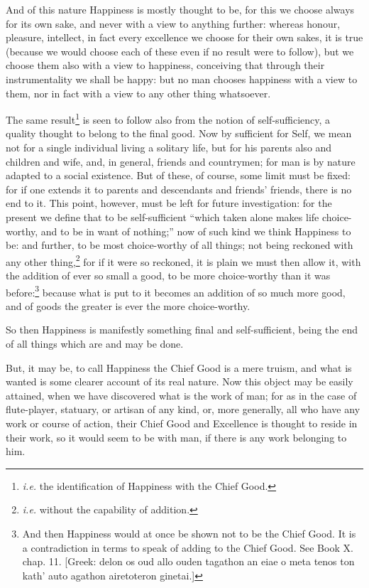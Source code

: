 And of this nature Happiness is mostly thought to be, for this we choose always
for its own sake, and never with a view to anything further: whereas honour,
pleasure, intellect, in fact every excellence we choose for their own sakes, it
is true (because we would choose each of these even if no result were to
follow), but we choose them also with a view to happiness, conceiving that
through their instrumentality we shall be happy: but no man chooses happiness
with a view to them, nor in fact with a view to any other thing whatsoever.

The same result\footnote{\emph{i.e.} the identification of Happiness with the Chief Good.}
is seen to follow also from the notion of self-sufficiency, a quality thought
to belong to the final good. Now by sufficient for Self, we mean not for a
single individual living a solitary life, but for his parents also and children
and wife, and, in general, friends and countrymen; for man is by nature adapted
to a social existence. But of these, of course, some limit must be fixed: for
if one extends it to parents and descendants and friends’ friends, there
is no end to it. This point, however, must be left for future investigation:
for the present we define that to be self-sufficient “which taken alone
makes life choice-worthy, and to be in want of nothing;” now of such kind
we think Happiness to be: and further, to be most choice-worthy of all things;
not being reckoned with any other thing,\footnote{\emph{i.e.} without the capability of addition.}
for if it were so reckoned, it is plain we must then allow it, with the
addition of ever so small a good, to be more choice-worthy than it was
before:\footnote{And then Happiness would at once be shown not to be the Chief Good. It is a
contradiction in terms to speak of adding to the Chief Good. See Book X. chap.
11. [Greek: delon os oud allo ouden tagathon an eiae o meta tenos ton
kath’ auto agathon airetoteron ginetai.]}
because what is put to it becomes an addition of so much more good, and of
goods the greater is ever the more choice-worthy.

So then Happiness is manifestly something final and self-sufficient, being the
end of all things which are and may be done.


But, it may be, to call Happiness the Chief Good is a mere truism, and what is
wanted is some clearer account of its real nature. Now this object may be
easily attained, when we have discovered what is the work of man; for as in the
case of flute-player, statuary, or artisan of any kind, or, more generally, all
who have any work or course of action, their Chief Good and Excellence is
thought to reside in their work, so it would seem to be with man, if there is
any work belonging to him.

